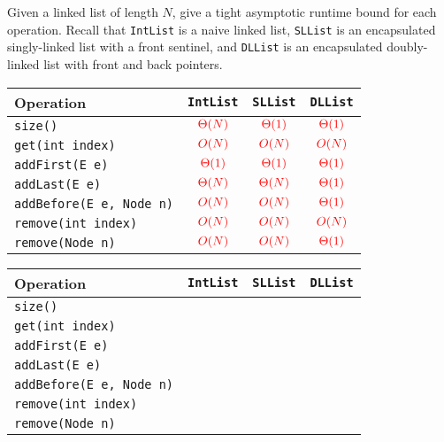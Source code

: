 \begin{blocksection}
\question Given a linked list of length $N$, give a tight asymptotic runtime
bound for each operation. Recall that \lstinline$IntList$ is a naive linked
list, \lstinline$SLList$ is an encapsulated singly-linked list with a front
sentinel, and \lstinline$DLList$ is an encapsulated doubly-linked list with
front and back pointers.

\ifprintanswers
{
\renewcommand{\arraystretch}{2}
\setlength{\tabcolsep}{16pt}
\begin{tabularx}{\textwidth}{Xccc}
Operation                          & \lstinline$IntList$    & \lstinline$SLList$     & \lstinline$DLList$     \\ \hline
\lstinline$size()$                 & $\color{red}\Theta(N)$ & $\color{red}\Theta(1)$ & $\color{red}\Theta(1)$ \\
\lstinline$get(int index)$         & $\color{red}O(N)$      & $\color{red}O(N)$      & $\color{red}O(N)$      \\
\lstinline$addFirst(E e)$          & $\color{red}\Theta(1)$ & $\color{red}\Theta(1)$ & $\color{red}\Theta(1)$ \\
\lstinline$addLast(E e)$           & $\color{red}\Theta(N)$ & $\color{red}\Theta(N)$ & $\color{red}\Theta(1)$ \\
\lstinline$addBefore(E e, Node n)$ & $\color{red}O(N)$      & $\color{red}O(N)$      & $\color{red}\Theta(1)$ \\
\lstinline$remove(int index)$      & $\color{red}O(N)$      & $\color{red}O(N)$      & $\color{red}O(N)$      \\
\lstinline$remove(Node n)$         & $\color{red}O(N)$      & $\color{red}O(N)$      & $\color{red}\Theta(1)$ \\
\end{tabularx}
}
\else
{
\renewcommand{\arraystretch}{2}
\setlength{\tabcolsep}{16pt}
\begin{tabularx}{\textwidth}{Xccc}
Operation                          & \lstinline$IntList$ & \lstinline$SLList$ & \lstinline$DLList$ \\ \hline
\lstinline$size()$                 &                     &                    &                    \\
\lstinline$get(int index)$         &                     &                    &                    \\
\lstinline$addFirst(E e)$          &                     &                    &                    \\
\lstinline$addLast(E e)$           &                     &                    &                    \\
\lstinline$addBefore(E e, Node n)$ &                     &                    &                    \\
\lstinline$remove(int index)$      &                     &                    &                    \\
\lstinline$remove(Node n)$         &                     &                    &                    \\
\end{tabularx}
}
\fi


\end{blocksection}
